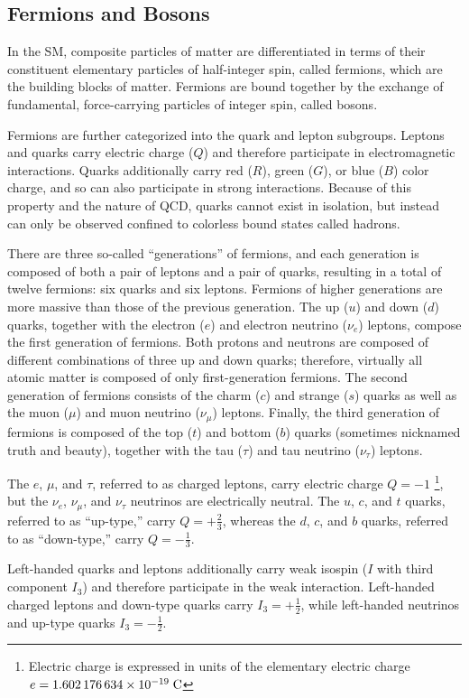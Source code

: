 \subsection{Fermions and Bosons}
In the SM, composite particles of matter are differentiated in terms of their constituent elementary particles of half-integer spin, called fermions, which are the building blocks of matter.
Fermions are bound together by the exchange of fundamental, force-carrying particles of integer spin, called bosons. 

Fermions are further categorized into the quark and lepton subgroups.
Leptons and quarks carry electric charge ($Q$) and therefore participate in electromagnetic interactions.
Quarks additionally carry red ($R$), green ($G$), or blue ($B$) color charge, and so can also participate in strong interactions.
Because of this property and the nature of QCD, quarks cannot exist in isolation, but instead can only be observed confined to colorless bound states called hadrons.

There are three so-called ``generations'' of fermions, and each generation is composed of both a pair of leptons and a pair of quarks, resulting in a total of twelve fermions: six quarks and six leptons.
Fermions of higher generations are more massive than those of the previous generation.
The up ($u$) and down ($d$) quarks, together with the electron ($e$) and electron neutrino ($\nu_e$) leptons, compose the first generation of fermions.
Both protons and neutrons are composed of different combinations of three up and down quarks; therefore, virtually all atomic matter is composed of only first-generation fermions.
The second generation of fermions consists of the charm ($c$) and strange ($s$) quarks as well as the muon ($\mu$) and muon neutrino ($\nu_\mu$) leptons.
Finally, the third generation of fermions is composed of the top ($t$) and bottom ($b$) quarks (sometimes nicknamed truth and beauty), together with the tau ($\tau$) and tau neutrino ($\nu_\tau$) leptons.

The $e$, $\mu$, and $\tau$, referred to as charged leptons, carry electric charge $Q = -1$ \footnote{Electric charge is expressed in units of the elementary electric charge $e = \num{1.602176634e-19} \; \si{\C}$}, but the $\nu_e$, $\nu_\mu$, and $\nu_\tau$ neutrinos are electrically neutral.
The $u$, $c$, and $t$ quarks, referred to as ``up-type,'' carry $Q = +\frac{2}{3}$, whereas the $d$, $c$, and $b$ quarks, referred to as ``down-type,'' carry $Q = -\frac{1}{3}$.

Left-handed quarks and leptons additionally carry weak isospin ($I$ with third component $I_3$) and therefore participate in the weak interaction.
Left-handed charged leptons and down-type quarks carry $I_3 = +\frac{1}{2}$, while left-handed neutrinos and up-type quarks $I_3 = -\frac{1}{2}$.

